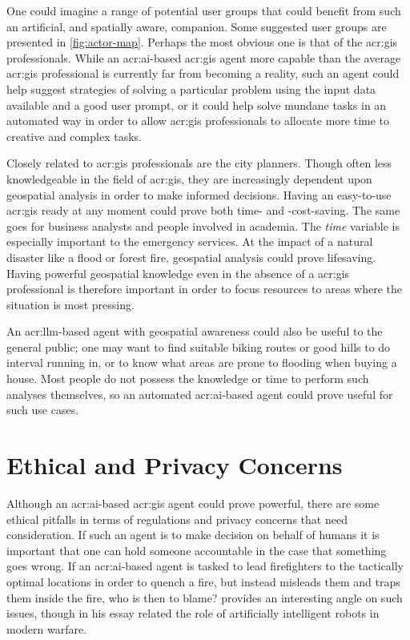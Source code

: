 One could imagine a range of potential user groups that could benefit from such an artificial, and spatially aware, companion. Some suggested user groups are presented in \autoref{fig:actor-map}. Perhaps the most obvious one is that of the \acrshort{acr:gis} professionals. While an \acrshort{acr:ai}-based \acrshort{acr:gis} agent more capable than the average \acrshort{acr:gis} professional is currently far from becoming a reality, such an agent could help suggest strategies of solving a particular problem using the input data available and a good user prompt, or it could help solve mundane tasks in an automated way in order to allow \acrshort{acr:gis} professionals to allocate more time to creative and complex tasks.

Closely related to \acrshort{acr:gis} professionals are the city planners. Though often less knowledgeable in the field of \acrshort{acr:gis}, they are increasingly dependent upon geospatial analysis in order to make informed decisions. Having an easy-to-use \acrshort{acr:gis} ready at any moment could prove both time- and -cost-saving. The same goes for business analysts and people involved in academia. The \textit{time} variable is especially important to the emergency services. At the impact of a natural disaster like a flood or forest fire, geospatial analysis could prove lifesaving. Having powerful geospatial knowledge even in the absence of a \acrshort{acr:gis} professional is therefore important in order to focus resources to areas where the situation is most pressing.

An \acrshort{acr:llm}-based agent with geospatial awareness could also be useful to the general public; one may want to find suitable biking routes or good hills to do interval running in, or to know what areas are prone to flooding when buying a house. Most people do not possess the knowledge or time to perform such analyses themselves, so an automated \acrshort{acr:ai}-based agent could prove useful for such use cases.



\section{Ethical and Privacy Concerns}\label{sec:ethical-and-privacy-concerns}

Although an \acrshort{acr:ai}-based \acrshort{acr:gis} agent could prove powerful, there are some ethical pitfalls in terms of regulations and privacy concerns that need consideration. If such an agent is to make decision on behalf of humans it is important that one can hold someone accountable in the case that something goes wrong. If an \acrshort{acr:ai}-based agent is tasked to lead firefighters to the tactically optimal locations in order to quench a fire, but  instead misleads them and traps them inside the fire, who is then to blame? \cite{sparrowKillerRobots2007} provides an interesting angle on such issues, though in his essay related the role of artificially intelligent robots in modern warfare.

